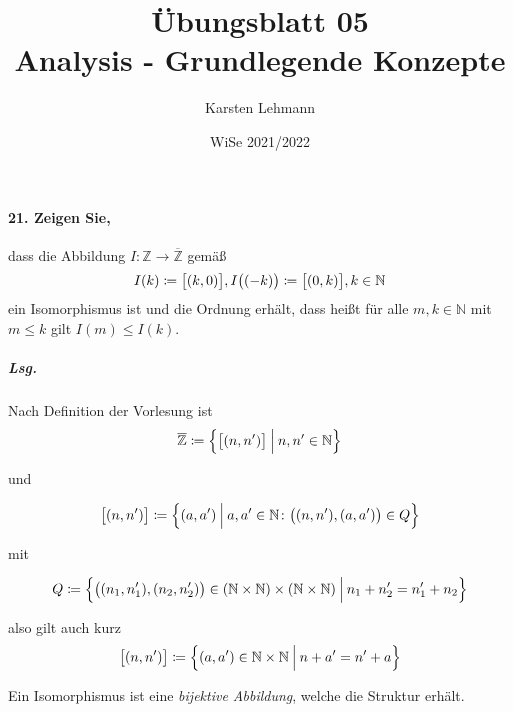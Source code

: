 \documentclass{scrreprt}
\author{Karsten Lehmann}
\date{WiSe 2021/2022}
\title{Übungsblatt 05\\Analysis - Grundlegende Konzepte}
\begin{document}
\paragraph{21. Zeigen Sie,} dass die Abbildung
$I \colon \mathbb{Z} \to \overline{\mathbb{Z}}$ gemäß
\[
  I(k) \coloneqq \qty\big[\qty(k, 0)],
  I\qty\big(\qty(-k)) \coloneqq \qty\big[\qty(0, k)],
  k \in \mathbb{N}
\]
ein Isomorphismus ist und die Ordnung erhält, dass heißt für alle
$m, k \in \mathbb{N}$ mit $m \leq k$ gilt $I(m) \leq I(k)$.

\subparagraph{Lsg.} Nach Definition der Vorlesung ist
\[
  \overline{\mathbb{Z}} \coloneqq \qty\Big{\qty\big[\qty(n, n')]
    \: {\Big |} \: n, n' \in \mathbb{N}}
\]

und

\[
  \qty\big[(n, n')] \coloneqq \qty\Big{(a, a') \: {\Big |} \:
    a, a' \in \mathbb{N} \colon \qty\big((n, n'), (a, a')) \in Q}
\]

mit

\[
  Q \coloneqq \qty\Big{\qty\big((n_1, n_1'), (n_2, n_2')) \in
    (\mathbb{N} \times \mathbb{N}) \times (\mathbb{N} \times \mathbb{N})
  \: {\Big |} \: n_1 + n_2' = n_1' + n_2}
\]

also gilt auch kurz
\[
  \qty\big[(n, n')] \coloneqq \qty\Big{(a, a') \in \mathbb{N} \times \mathbb{N}
  \: {\Big |} \: n + a' = n' + a}
\]

Ein Isomorphismus ist eine \emph{bijektive Abbildung}, welche die Struktur
erhält. \\
\end{document}
